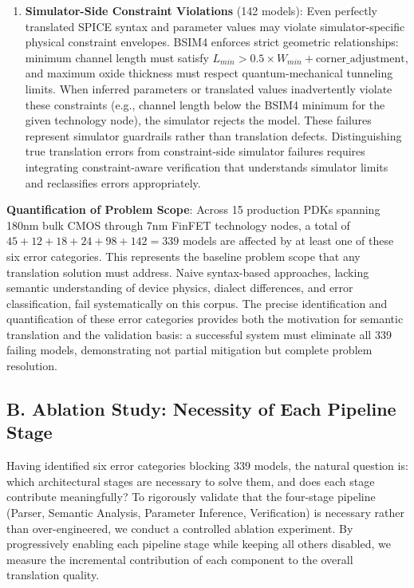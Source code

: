 \documentclass[conference]{IEEEtran}
\begin{document}
\begin{enumerate}
\item \textbf{Simulator-Side Constraint Violations} (142 models): Even perfectly translated SPICE syntax and parameter values may violate simulator-specific physical constraint envelopes. BSIM4 enforces strict geometric relationships: minimum channel length must satisfy $L_{min} > 0.5 \times W_{min} + \text{corner\_adjustment}$, and maximum oxide thickness must respect quantum-mechanical tunneling limits. When inferred parameters or translated values inadvertently violate these constraints (e.g., channel length below the BSIM4 minimum for the given technology node), the simulator rejects the model. These failures represent simulator guardrails rather than translation defects. Distinguishing true translation errors from constraint-side simulator failures requires integrating constraint-aware verification that understands simulator limits and reclassifies errors appropriately.
\end{enumerate}

\textbf{Quantification of Problem Scope}: Across 15 production PDKs spanning 180nm bulk CMOS through 7nm FinFET technology nodes, a total of $45 + 12 + 18 + 24 + 98 + 142 = 339$ models are affected by at least one of these six error categories. This represents the baseline problem scope that any translation solution must address. Naive syntax-based approaches, lacking semantic understanding of device physics, dialect differences, and error classification, fail systematically on this corpus. The precise identification and quantification of these error categories provides both the motivation for semantic translation and the validation basis: a successful system must eliminate all 339 failing models, demonstrating not partial mitigation but complete problem resolution.

\subsection{B. Ablation Study: Necessity of Each Pipeline Stage}
\label{sec:results-ablation}

Having identified six error categories blocking 339 models, the natural question is: which architectural stages are necessary to solve them, and does each stage contribute meaningfully? To rigorously validate that the four-stage pipeline (Parser, Semantic Analysis, Parameter Inference, Verification) is necessary rather than over-engineered, we conduct a controlled ablation experiment. By progressively enabling each pipeline stage while keeping all others disabled, we measure the incremental contribution of each component to the overall translation quality.
\end{document}
